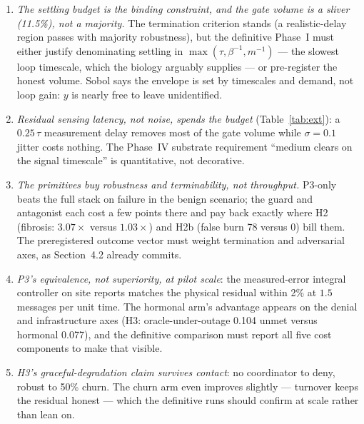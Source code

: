 \documentclass[twoside,twocolumn,usenatbib]{mnras}
\begin{document}
\begin{enumerate}
\item \emph{The settling budget is the binding constraint, and the
gate volume is a sliver (11.5\%), not a majority.}  The termination
criterion stands (a realistic-delay region passes with majority
robustness), but the definitive Phase~I must either justify
denominating settling in $\max(\tau, \beta^{-1}, m^{-1})$ --- the
slowest loop timescale, which the biology arguably supplies --- or
pre-register the honest volume.  Sobol says the envelope is set by
timescales and demand, not loop gain: $y$ is nearly free to leave
unidentified.
\item \emph{Residual sensing latency, not noise, spends the budget}
(Table~\ref{tab:ext}): a $0.25\,\tau$ measurement delay removes most
of the gate volume while $\sigma = 0.1$ jitter costs nothing.  The
Phase~IV substrate requirement ``medium clears on the signal
timescale'' is quantitative, not decorative.
\item \emph{The primitives buy robustness and terminability, not
throughput.}  P3-only beats the full stack on failure in the benign
scenario; the guard and antagonist each cost a few points there and
pay back exactly where H2 (fibrosis: $3.07\times$ versus
$1.03\times$) and H2b (false burn 78 versus 0) bill them.  The
preregistered outcome vector must weight termination and adversarial
axes, as Section~4.2 already commits.
\item \emph{P3's equivalence, not superiority, at pilot scale}: the
measured-error integral controller on site reports matches the
physical residual within 2\% at $1.5$ messages per unit time.  The
hormonal arm's advantage appears on the denial and infrastructure
axes (H3: oracle-under-outage 0.104 unmet versus hormonal 0.077), and
the definitive comparison must report all five cost components to
make that visible.
\item \emph{H3's graceful-degradation claim survives contact}: no
coordinator to deny, robust to 50\% churn.  The churn arm even
improves slightly --- turnover keeps the residual honest --- which
the definitive runs should confirm at scale rather than lean on.
\end{enumerate}
\end{document}
